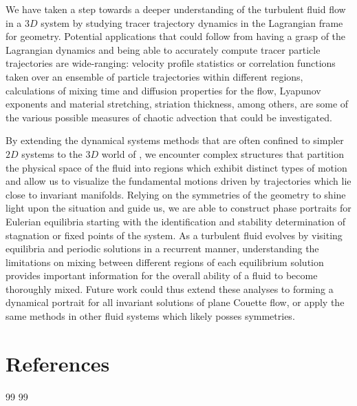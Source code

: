 \documentclass[lineno]{jfm}
\begin{document}
We have taken a step towards a deeper understanding of the  turbulent 
fluid flow in a $3D$ system  by studying 
tracer trajectory dynamics in the Lagrangian frame for {\pC} geometry. Potential 
applications that could follow from having a grasp of the Lagrangian 
dynamics and being able to accurately compute tracer particle 
trajectories are wide-ranging: velocity profile statistics or correlation 
functions taken over an ensemble of particle trajectories within 
different regions, calculations of mixing time and diffusion properties 
for the flow, Lyapunov exponents and material stretching, striation 
thickness, among others, are some of the various possible measures of 
chaotic advection that could be investigated.  

By extending the dynamical 
systems methods that are often confined to simpler $2D$ systems to the 
$3D$ world of {\pCf}, we encounter complex structures that 
partition the physical space of the fluid into regions which exhibit 
distinct types of motion and allow us to visualize the fundamental 
motions driven by trajectories which lie close to invariant manifolds. 
Relying on the symmetries of the geometry to shine light upon the 
situation and guide us, we are able to construct phase portraits for 
{\pC} Eulerian equilibria starting with the identification and stability 
determination of stagnation or fixed points of the system. As a turbulent fluid evolves by visiting equilibria and periodic solutions in a recurrent manner, understanding the limitations on mixing between different regions of each equilibrium solution provides important information for the overall ability of a fluid to become thoroughly mixed.  Future work could thus extend these analyses to forming a dynamical portrait for all invariant solutions of plane
 Couette flow, or apply the same methods in other fluid systems which likely posses symmetries.



    \ifsubmission
\section*{References}
{99} %
    \else
{99} %
    \fi
\end{document}
